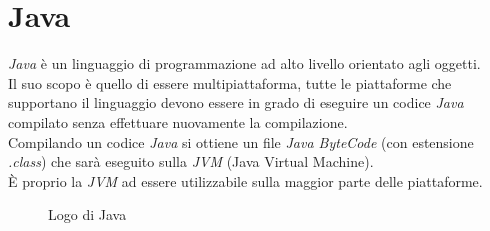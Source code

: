 \section{Java}
\emph{Java} è un linguaggio di programmazione ad alto livello orientato agli oggetti.\\
Il suo scopo è quello di essere multipiattaforma, tutte le piattaforme che supportano il linguaggio devono essere in grado di eseguire un codice \emph{Java} compilato senza effettuare nuovamente la compilazione.\\
Compilando un codice \emph{Java} si ottiene un file \emph{Java ByteCode} (con estensione \emph{.class}) che sarà eseguito sulla \emph{JVM} (Java Virtual Machine).\\
È proprio la \emph{JVM} ad essere utilizzabile sulla maggior parte delle piattaforme.\\
\begin{figure}[ht]
	\centering
	\caption{Logo di Java}
	\label{fig:one}
\end{figure}

